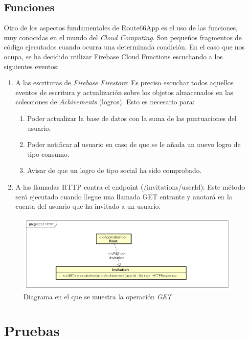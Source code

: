 \documentclass[twoside]{report}
\begin{document}
\subsection{Funciones}

Otro de los aspectos fundamentales de Route66App es el uso de las funciones, muy conocidas en el mundo del \textit{Cloud Computing}. Son pequeños fragmentos de código ejecutados cuando ocurra una determinada condición. En el caso que nos ocupa, se ha decidido utilizar Firebase Cloud Functions escuchando a los siguientes eventos:

\begin{enumerate}
\item A las escrituras de \textit{Firebase Firestore}: Es preciso escuchar todos aquellos eventos de escritura y actualización sobre los objetos almacenados en las colecciones de \textit{Achivements} (logros). Esto es necesario para:
	\begin{enumerate}
		\item Poder actualizar la base de datos con la suma de las puntuaciones del usuario.
		\item Poder notificar al usuario en caso de que se le añada un nuevo logro de tipo consumo.
		\item Avisar de que un logro de tipo social ha sido comprobado.
	\end{enumerate}

\item A las llamadas HTTP contra el endpoint (/invitations/{userId}): Este método será ejecutado cuando llegue una llamada GET entrante y anotará en la cuenta del usuario que ha invitado a un usuario.
\end{enumerate}


\begin{figure}[H]
\centering
\includegraphics[scale=0.7]{images/restAPI}
\caption{Diagrama en el que se muestra la operación \textit{GET}}
\end{figure}

\section{Pruebas}
\end{document}
